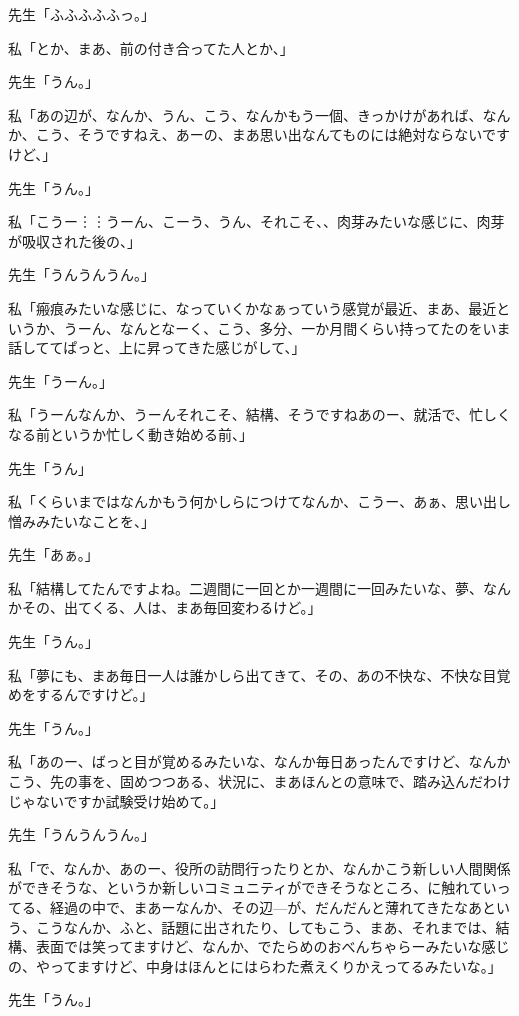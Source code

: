 \documentclass[b5j,twoside,twocolumn]{utarticle}
\begin{document}
\begin{description}
\item 先生「ふふふふふっ。」
\item 私「とか、まあ、前の付き合ってた人とか、」
\item 先生「うん。」
\item 私「あの辺が、なんか、うん、こう、なんかもう一個、きっかけがあれば、なんか、こう、そうですねえ、あーの、まあ思い出なんてものには絶対ならないですけど、」
\item 先生「うん。」
\item 私「こうー︙︙うーん、こーう、うん、それこそ、、肉芽みたいな感じに、肉芽が吸収された後の、」
\item 先生「うんうんうん。」
\item 私「瘢痕みたいな感じに、なっていくかなぁっていう感覚が最近、まあ、最近というか、うーん、なんとなーく、こう、多分、一か月間くらい持ってたのをいま話しててぱっと、上に昇ってきた感じがして、」
\item 先生「うーん。」
\item 私「うーんなんか、うーんそれこそ、結構、そうですねあのー、就活で、忙しくなる前というか忙しく動き始める前、」
\item 先生「うん」
\item 私「くらいまではなんかもう何かしらにつけてなんか、こうー、あぁ、思い出し憎みみたいなことを、」
\item 先生「あぁ。」
\item 私「結構してたんですよね。二週間に一回とか一週間に一回みたいな、夢、なんかその、出てくる、人は、まあ毎回変わるけど。」
\item 先生「うん。」
\item 私「夢にも、まあ毎日一人は誰かしら出てきて、その、あの不快な、不快な目覚めをするんですけど。」
\item 先生「うん。」
\item 私「あのー、ばっと目が覚めるみたいな、なんか毎日あったんですけど、なんかこう、先の事を、固めつつある、状況に、まあほんとの意味で、踏み込んだわけじゃないですか試験受け始めて。」
\item 先生「うんうんうん。」
\item 私「で、なんか、あのー、役所の訪問行ったりとか、なんかこう新しい人間関係ができそうな、というか新しいコミュニティができそうなところ、に触れていってる、経過の中で、まあーなんか、その辺—が、だんだんと薄れてきたなあという、こうなんか、ふと、話題に出されたり、してもこう、まあ、それまでは、結構、表面では笑ってますけど、なんか、でたらめのおべんちゃらーみたいな感じの、やってますけど、中身はほんとにはらわた煮えくりかえってるみたいな。」
\item 先生「うん。」

\end{description}
\end{document}
